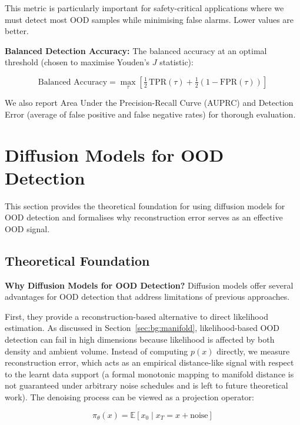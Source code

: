 This metric is particularly important for safety-critical applications where we must detect most OOD samples while minimising false alarms. Lower values are better.

\textbf{Balanced Detection Accuracy:} The balanced accuracy at an optimal threshold (chosen to maximise Youden's $J$ statistic):

\begin{equation}
\label{eq:meth:balanced}
\text{Balanced Accuracy} = \max_\tau \left[ \tfrac{1}{2}\,\text{TPR}(\tau) + \tfrac{1}{2}\left(1 - \text{FPR}(\tau)\right) \right]
\end{equation}

We also report Area Under the Precision-Recall Curve (AUPRC) and Detection Error (average of false positive and false negative rates) for thorough evaluation.


\section{Diffusion Models for OOD Detection}
\label{sec:meth:diffusion}

This section provides the theoretical foundation for using diffusion models for OOD detection and formalises why reconstruction error serves as an effective OOD signal.

\subsection{Theoretical Foundation}
\label{sec:meth:diffusion:theory}

\textbf{Why Diffusion Models for OOD Detection?}
Diffusion models offer several advantages for OOD detection that address limitations of previous approaches.

First, they provide a reconstruction-based alternative to direct likelihood estimation. As discussed in Section~\ref{sec:bg:manifold}, likelihood-based OOD detection can fail in high dimensions because likelihood is affected by both density and ambient volume. Instead of computing $p(x)$ directly, we measure reconstruction error, which acts as an empirical distance-like signal with respect to the learnt data support (a formal monotonic mapping to manifold distance is not guaranteed under arbitrary noise schedules and is left to future theoretical work). The denoising process can be viewed as a projection operator:

\begin{equation}
\label{eq:meth:projection}
\pi_\theta(x) = \mathbb{E}[x_0 \mid x_T = x + \text{noise}]
\end{equation}

